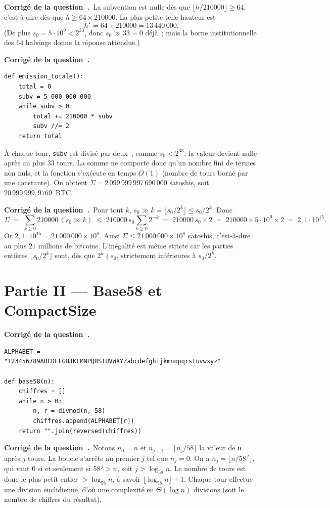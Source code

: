 \documentclass[11pt,a4paper]{article}
\newcounter{qcnt}
\newcommand{\Q}{\medskip\par\stepcounter{qcnt}\noindent\textbf{Corrigé de la question~\theqcnt.}~}
\newcommand{\code}[1]{\lstinline!#1!}
\begin{document}
\Q La subvention est nulle dès que $\lfloor h/210000\rfloor \ge 64$, c'est-à-dire dès que $h \ge 64\times 210000$. La plus petite telle hauteur est
\[
  h^\star = 64\times 210000 = 13\,440\,000.
\]
(De plus $s_0 = 5\cdot10^9 < 2^{33}$, donc $s_0\gg 33 = 0$ déjà~; mais la borne institutionnelle des $64$ halvings donne la réponse attendue.)

\Q
\begin{lstlisting}
def emission_totale():
    total = 0
    subv = 5_000_000_000
    while subv > 0:
        total += 210000 * subv
        subv //= 2
    return total
\end{lstlisting}
À chaque tour, \code{subv} est divisé par deux~; comme $s_0<2^{33}$, la valeur devient nulle après au plus $33$ tours. La somme ne comporte donc qu'un nombre fini de termes non nuls, et la fonction s'exécute en temps $O(1)$ (nombre de tours borné par une constante). On obtient $\Sigma = 2\,099\,999\,997\,690\,000$ satoshis, soit $20\,999\,999{,}9769$~\textsc{BTC}.

\Q Pour tout $k$, $s_0\gg k = \lfloor s_0/2^k\rfloor \le s_0/2^k$. Donc
\[
  \Sigma \;=\; \sum_{k\ge 0} 210000\,(s_0\gg k)
  \;\le\; 210000\, s_0 \sum_{k\ge 0} 2^{-k}
  \;=\; 210000\, s_0 \times 2
  \;=\; 210000 \times 5\cdot10^{9}\times 2
  \;=\; 2{,}1\cdot10^{15}.
\]
Or $2{,}1\cdot10^{15} = 21\,000\,000\times 10^{8}$. Ainsi $\Sigma \le 21\,000\,000\times10^8$ satoshis, c'est-à-dire au plus $21$ millions de bitcoins. L'inégalité est même stricte car les parties entières $\lfloor s_0/2^k\rfloor$ sont, dès que $2^k\nmid s_0$, strictement inférieures à $s_0/2^k$.

\section*{Partie II --- Base58 et CompactSize}

\Q
\begin{lstlisting}
ALPHABET = "123456789ABCDEFGHJKLMNPQRSTUVWXYZabcdefghijkmnopqrstuvwxyz"

def base58(n):
    chiffres = []
    while n > 0:
        n, r = divmod(n, 58)
        chiffres.append(ALPHABET[r])
    return "".join(reversed(chiffres))
\end{lstlisting}

\Q Notons $n_0 = n$ et $n_{j+1} = \lfloor n_j/58\rfloor$ la valeur de \code{n} après $j$ tours. La boucle s'arrête au premier $j$ tel que $n_j = 0$. On a $n_j = \lfloor n/58^{\,j}\rfloor$, qui vaut $0$ si et seulement si $58^{\,j} > n$, soit $j > \log_{58} n$. Le nombre de tours est donc le plus petit entier $> \log_{58} n$, à savoir $\lfloor \log_{58} n\rfloor + 1$. Chaque tour effectue une division euclidienne, d'où une complexité en $\Theta(\log n)$ divisions (soit le nombre de chiffres du résultat).
\end{document}

